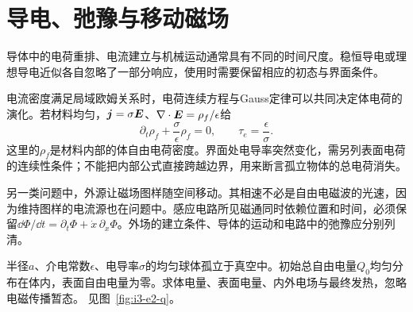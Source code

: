 \section{导电、弛豫与移动磁场}\label{sec:i3-conduct}
导体中的电荷重排、电流建立与机械运动通常具有不同的时间尺度。稳恒导电或理想导电近似各自忽略了一部分响应，使用时需要保留相应的初态与界面条件。

电流密度满足局域欧姆关系时，电荷连续方程与Gauss定律可以共同决定体电荷的演化。若材料均匀，$\bm{j}=\sigma\bm{E}$、$\nabla\cdot\bm{E}=\rho_f/\epsilon$给
\[\partial_t\rho_f+\frac{\sigma}{\epsilon}\rho_f=0,\qquad
\tau_e=\frac{\epsilon}{\sigma}.
\]
这里的$\rho_f$是材料内部的体自由电荷密度。界面处电导率突然变化，需另列表面电荷的连续性条件；不能把内部公式直接跨越边界，用来断言孤立物体的总电荷消失。

另一类问题中，外源让磁场图样随空间移动。其相速不必是自由电磁波的光速，因为维持图样的电流源也在问题中。感应电路所见磁通同时依赖位置和时间，必须保留$\dd\Phi/\dd t=\partial_t\Phi+\dot x\,\partial_x\Phi$。外场的建立条件、导体的运动和电路中的弛豫应分别列清。


\begin{example}[孤立导体球的体电荷去了哪里]\label{ex:i3-e2}
半径$a$、介电常数$\epsilon$、电导率$\sigma$的均匀球体孤立于真空中。初始总自由电量$Q_0$均匀分布在体内，表面自由电量为零。求体电量、表面电量、内外电场与最终发热，忽略电磁传播暂态。 见图~\ref{fig:i3-e2-q}。
\end{example}

